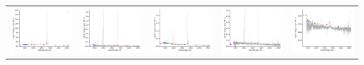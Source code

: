 \begin{center}
\begin{longtable}{l l l l l }
    \includegraphics[width=0.2\linewidth, clip]{Figs/Figs-sdss/spec-1069-52590-0193-STRIPE82-0059-041056.pdf} & \includegraphics[width=0.2\linewidth, clip]{Figs/Figs-sdss/spec-1071-52641-0013-STRIPE82-0057-050992.pdf} & \includegraphics[width=0.2\linewidth, clip]{Figs/Figs-sdss/spec-1071-52641-0266-STRIPE82-0053-009717.pdf} & \includegraphics[width=0.2\linewidth, clip]{Figs/Figs-sdss/spec-1071-52641-0358-STRIPE82-0054-042573.pdf} & \includegraphics[width=0.2\linewidth, clip]{Figs/Figs-sdss/spec-1073-52649-0091-STRIPE82-0049-021805.pdf} \\

\end{longtable}
\end{center}
